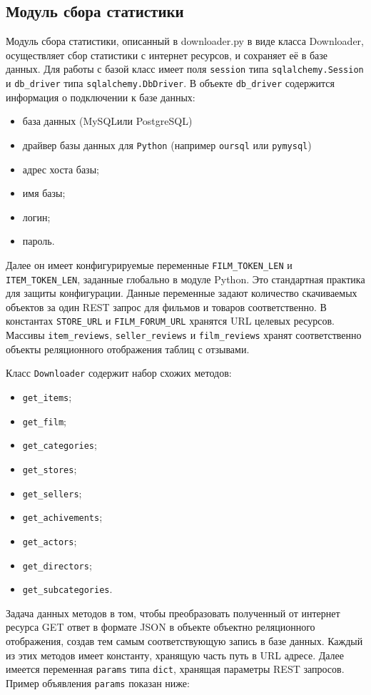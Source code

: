 \subsection{Модуль сбора статистики}
Модуль сбора статистики, описанный в downloader.py в виде класса Downloader, осуществляет сбор статистики с интернет ресурсов, и сохраняет её в базе данных. Для работы с базой класс имеет поля \texttt{session} типа \texttt{sqlalchemy.Session} и \texttt{db\_driver} типа \texttt{sqlalchemy.DbDriver}. В объекте \texttt{db\_driver} содержится информация о подключении к базе данных:
\begin{itemize}
\item база данных (MySQL\@ или PostgreSQL\@)
\item драйвер базы данных для \texttt{Python} (например \texttt{oursql} или \texttt{pymysql})
\item адрес хоста базы;
\item имя базы;
\item логин;
\item пароль.
\end{itemize}
Далее он имеет конфигурируемые переменные \texttt{FILM\_TOKEN\_LEN} и \texttt{ITEM\_\-TO\-KEN\_LEN}, заданные глобально в модуле Python. Это стандартная практика для защиты конфигурации. Данные переменные задают количество скачиваемых объектов за один REST запрос для фильмов и товаров соответственно. В константах \texttt{STORE\_URL} и \texttt{FILM\_FORUM\_URL} хранятся URL целевых ресурсов. Массивы \texttt{item\_reviews}, \texttt{seller\_reviews} и \texttt{film\_reviews} хранят соответственно объекты реляционного отображения таблиц с отзывами.

Класс \texttt{Downloader} содержит набор схожих методов:
\begin{itemize}
\item \texttt{get\_items};
\item \texttt{get\_film};
\item \texttt{get\_categories};
\item \texttt{get\_stores};
\item \texttt{get\_sellers};
\item \texttt{get\_achivements};
\item \texttt{get\_actors};
\item \texttt{get\_directors};
\item \texttt{get\_subcategories}.
\end{itemize}

Задача данных методов в том, чтобы преобразовать полученный от интернет ресурса GET ответ в формате JSON в объекте объектно реляционного отображения, создав тем самым соответствующую запись в базе данных. Каждый из этих методов имеет константу, хранящую часть путь в URL адресе. Далее имеется переменная {\texttt{params}} типа \texttt{dict}, хранящая параметры REST запросов. Пример объявления \texttt{params} показан ниже:

